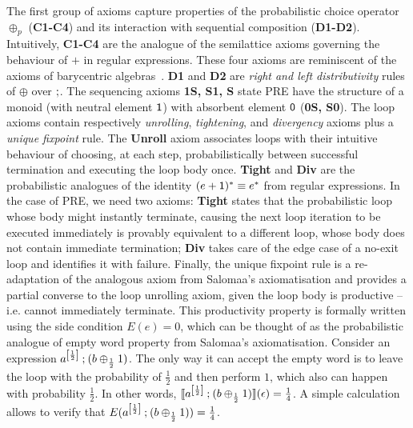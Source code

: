 The first group of axioms capture properties of the probabilistic choice operator $\oplus_p$ (\textbf{C1-C4}) and its interaction with sequential composition (\textbf{D1-D2}). Intuitively, \textbf{C1-C4} are the analogue of the semilattice axioms governing the behaviour of $+$ in regular expressions. These four axioms are reminiscent of the axioms of barycentric algebras~\cite{Stone:1949:Postulates}. \textbf{D1} and \textbf{D2} are \emph{right and left distributivity} rules of $\oplus$ over $\mathbin{;}$. The sequencing axioms \textbf{1S, S1, S}  state {PRE} have the structure of a monoid (with neutral element $\mathsf{1}$) with absorbent element $\mathsf{0}$ (\textbf{0S, S0}). The loop axioms contain respectively \emph{unrolling}, \emph{tightening}, and \emph{divergency} axioms plus a \emph{unique fixpoint} rule. The \textbf{Unroll} axiom associates loops with their intuitive behaviour of choosing, at each step, probabilistically between successful termination and executing the loop body once. \textbf{Tight} and \textbf{Div} are the probabilistic analogues of the identity $(e + \mathsf{1})^{*} \equiv e^{*}$ from regular expressions. In the case of {PRE}, we need two axioms: \textbf{Tight} states that the probabilistic loop whose body might instantly terminate, causing the next loop iteration to be executed immediately is provably equivalent to a different loop, whose body does not contain immediate termination; \textbf{Div} takes care of the edge case of a no-exit loop and identifies it with failure. Finally, the unique fixpoint rule is a re-adaptation of the analogous axiom from Salomaa's axiomatisation and provides a partial converse to the loop unrolling axiom, given the loop body is productive -- i.e. cannot immediately terminate. This productivity property is formally written using the side condition $E(e) = 0$, which can be thought of as the probabilistic analogue of empty word property from Salomaa’s axiomatisation. Consider an expression $a^{\left[\frac{1}{2}\right]} \mathbin{;} (b \oplus_{\frac{1}{2}} 1)$. The only way it can accept the empty word is to leave the loop with the probability of $\frac{1}{2}$ and then perform $1$, which also can happen with probability $\frac{1}{2}$. In other words, $\llbracket a^{\left[\frac{1}{2}\right]} \mathbin{;} (b \oplus_{\frac{1}{2}} 1)\rrbracket(\epsilon) = \frac{1}{4}$. A simple calculation allows to verify that $E( a^{\left[\frac{1}{2}\right]} \mathbin{;} (b \oplus_{\frac{1}{2}} 1)) = \frac{1}{4}$.





